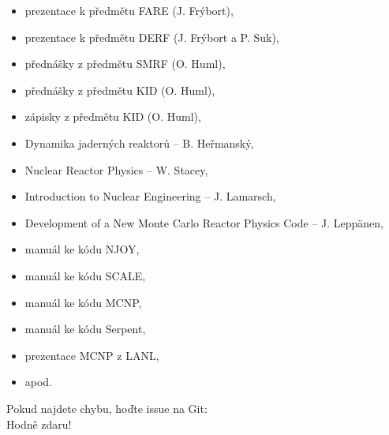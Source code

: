 \documentclass[a4paper, 11pt]{article}
\begin{document}
\begin{itemize}
    \item prezentace k předmětu FARE (J. Frýbort),
    \item prezentace k předmětu DERF (J. Frýbort a P. Suk),
    \item přednášky z předmětu SMRF (O. Huml),
    \item přednášky z předmětu KID (O. Huml),
    \item zápisky z předmětu KID (O. Huml),
    \item Dynamika jaderných reaktorů -- B. Heřmanský,
    \item Nuclear Reactor Physics -- W. Stacey,
    \item Introduction to Nuclear Engineering -- J. Lamarsch,
    \item Development of a New Monte Carlo Reactor Physics Code -- J. Leppänen,
    \item manuál ke kódu NJOY,
    \item manuál ke kódu SCALE,
    \item manuál ke kódu MCNP,
    \item manuál ke kódu Serpent,
    \item prezentace MCNP z LANL,
    \item apod.
\end{itemize}

Pokud najdete chybu, hoďte issue na Git: \\

\rm Hodně zdaru!

\vspace{2em}

\clearpage{\pagestyle{empty}}



\newpage
\parskip=0pt
\begin{small}
\tableofcontents
\end{small}
\parskip=7pt
\newpage










\end{document}

